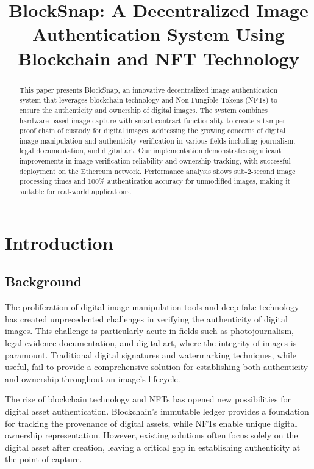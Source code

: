\documentclass[conference]{IEEEtran}
\begin{document}
\title{BlockSnap: A Decentralized Image Authentication System Using Blockchain and NFT Technology}

\author{
}

\maketitle

\begin{abstract}
This paper presents BlockSnap, an innovative decentralized image authentication system that leverages blockchain technology and Non-Fungible Tokens (NFTs) to ensure the authenticity and ownership of digital images. The system combines hardware-based image capture with smart contract functionality to create a tamper-proof chain of custody for digital images, addressing the growing concerns of digital image manipulation and authenticity verification in various fields including journalism, legal documentation, and digital art. Our implementation demonstrates significant improvements in image verification reliability and ownership tracking, with successful deployment on the Ethereum network. Performance analysis shows sub-2-second image processing times and 100\% authentication accuracy for unmodified images, making it suitable for real-world applications.
\end{abstract}

\section{Introduction}
\subsection{Background}
The proliferation of digital image manipulation tools and deep fake technology has created unprecedented challenges in verifying the authenticity of digital images. This challenge is particularly acute in fields such as photojournalism, legal evidence documentation, and digital art, where the integrity of images is paramount. Traditional digital signatures and watermarking techniques, while useful, fail to provide a comprehensive solution for establishing both authenticity and ownership throughout an image's lifecycle.

The rise of blockchain technology and NFTs has opened new possibilities for digital asset authentication. Blockchain's immutable ledger provides a foundation for tracking the provenance of digital assets, while NFTs enable unique digital ownership representation. However, existing solutions often focus solely on the digital asset after creation, leaving a critical gap in establishing authenticity at the point of capture.
\end{document}
